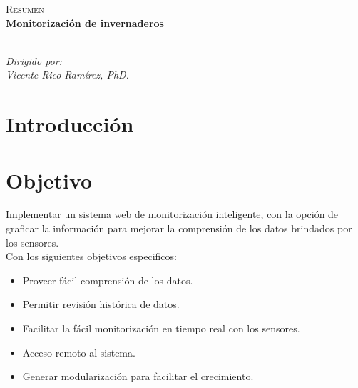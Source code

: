 \documentclass[12pt]{report}
\begin{document}
\restoregeometry
\thispagestyle{empty}
\begin{center}
\textsc{\Huge Resumen}\\[0.5cm]
\textbf{\large Monitorización de invernaderos}\\[0.25cm]
\\[0.5cm]
\end{center}



\begin{flushright}
    \textit{\large Dirigido por:}\\
    \textit{\large Vicente Rico Ramírez, PhD.}
\end{flushright}


\restoregeometry
\tableofcontents

\newpage
{}
\chapter{Introducción}
\chapter{Objetivo}
\large{Implementar un sistema web de monitorización inteligente, con la opción de graficar la información para mejorar la comprensión de los datos brindados por los sensores.}\\[1cm]
\large{Con los siguientes objetivos especificos: }
\begin{itemize}
    \item Proveer fácil comprensión de los datos.
    \item Permitir revisión histórica de datos.
    \item Facilitar la fácil monitorización en tiempo real con los sensores.
    \item Acceso remoto al sistema.
    \item Generar modularización para facilitar el crecimiento.
\end{itemize}
\end{document}
